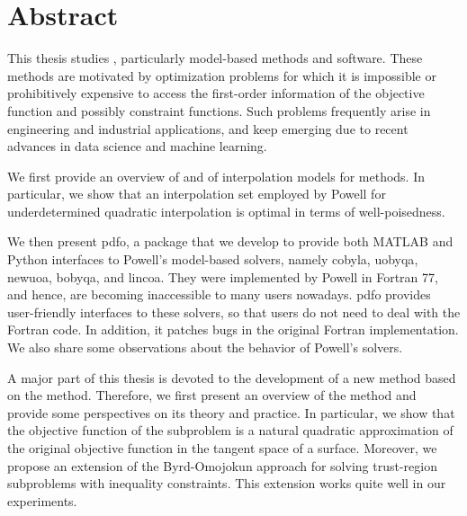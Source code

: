 %
%
%
\chapter*{Abstract}
\label{ch:abstract}

This thesis studies , particularly model-based methods and software.
These methods are motivated by optimization problems for which it is impossible or prohibitively expensive to access the first-order information of the objective function and possibly constraint functions.
Such problems frequently arise in engineering and industrial applications, and keep emerging due to recent advances in data science and machine learning.

We first provide an overview of  and of interpolation models for  methods.
In particular, we show that an interpolation set employed by Powell for underdetermined quadratic interpolation is optimal in terms of well-poisedness.

We then present \gls{pdfo}, a package that we develop to provide both MATLAB and Python interfaces to Powell's model-based  solvers, namely \gls{cobyla}, \gls{uobyqa}, \gls{newuoa}, \gls{bobyqa}, and \gls{lincoa}.
They were implemented by Powell in Fortran 77, and hence, are becoming inaccessible to many users nowadays.
\Gls{pdfo} provides user-friendly interfaces to these solvers, so that users do not need to deal with the Fortran code.
In addition, it patches bugs in the original Fortran implementation.
We also share some observations about the behavior of Powell's solvers.

A major part of this thesis is devoted to the development of a new  method based on the  method.
Therefore, we first present an overview of the  method and provide some perspectives on its theory and practice.
In particular, we show that the objective function of the  subproblem is a natural quadratic approximation of the original objective function in the tangent space of a surface.
Moreover, we propose an extension of the Byrd-Omojokun approach for solving trust-region  subproblems with inequality constraints.
This extension works quite well in our experiments.

